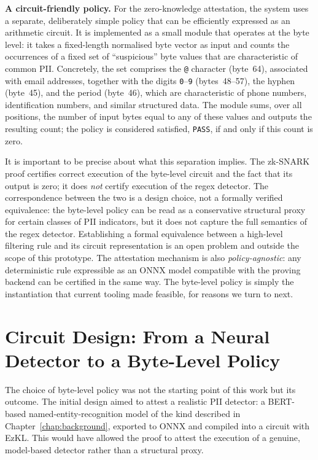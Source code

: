 \medskip

\textbf{A circuit-friendly policy.} For the zero-knowledge attestation, the system uses a separate, deliberately simple policy that can be efficiently expressed as an arithmetic circuit. It is implemented as a small module that operates at the byte level: it takes a fixed-length normalised byte vector as input and counts the occurrences of a fixed set of ``suspicious'' byte values that are characteristic of common PII. Concretely, the set comprises the \texttt{@} character (byte~64), associated with email addresses, together with the digits \texttt{0}--\texttt{9} (bytes~48--57), the hyphen (byte~45), and the period (byte~46), which are characteristic of phone numbers, identification numbers, and similar structured data. The module sums, over all positions, the number of input bytes equal to any of these values and outputs the resulting count; the policy is considered satisfied, \texttt{PASS}, if and only if this count is zero.

\medskip

It is important to be precise about what this separation implies. The zk-SNARK proof certifies correct execution of the byte-level circuit and the fact that its output is zero; it does \emph{not} certify execution of the regex detector. The correspondence between the two is a design choice, not a formally verified equivalence: the byte-level policy can be read as a conservative structural proxy for certain classes of PII indicators, but it does not capture the full semantics of the regex detector. Establishing a formal equivalence between a high-level filtering rule and its circuit representation is an open problem and outside the scope of this prototype. The attestation mechanism is also \emph{policy-agnostic}: any deterministic rule expressible as an ONNX model compatible with the proving backend can be certified in the same way. The byte-level policy is simply the instantiation that current tooling made feasible, for reasons we turn to next.

\section{Circuit Design: From a Neural Detector to a Byte-Level Policy}
\label{sec:sd-circuit}

The choice of byte-level policy was not the starting point of this work but its outcome. The initial design aimed to attest a realistic PII detector: a BERT-based named-entity-recognition model of the kind described in Chapter~\ref{chap:background}, exported to ONNX and compiled into a circuit with EzKL. This would have allowed the proof to attest the execution of a genuine, model-based detector rather than a structural proxy.

